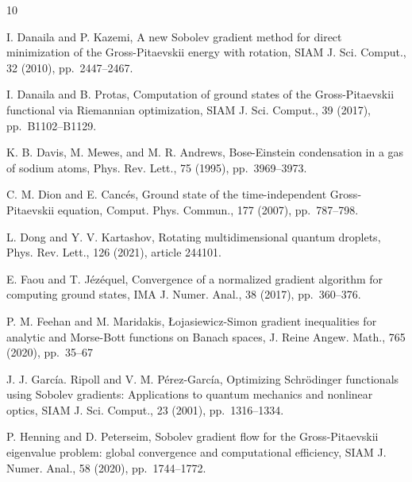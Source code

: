 \documentclass[preprint,3p]{elsarticle}
\begin{document}
\begin{thebibliography}{10}
	
	{ I. Danaila and P. Kazemi}, { A new {S}obolev gradient method for
		direct minimization of the {G}ross-{P}itaevskii energy with rotation}, SIAM
	J. Sci. Comput., 32 (2010), pp.~2447--2467.
	
	{ I. Danaila and B. Protas}, { Computation of ground states of the
		{G}ross-{P}itaevskii functional via {R}iemannian optimization}, SIAM J. Sci. Comput., 39 (2017), pp.~B1102--B1129.
	
	{ K. B. Davis, M. Mewes, and M. R. Andrews}, { Bose-{E}instein condensation
		in a gas of sodium atoms}, Phys. Rev. Lett., 75 (1995), pp.~3969--3973.
	
	{ C. M. Dion and E. Canc\'es}, { Ground state of the time-independent Gross-Pitaevskii equation}, Comput. Phys. Commun., 177 (2007), pp.~787--798.
	
	{ L. Dong and Y. V. Kartashov}, { Rotating multidimensional quantum droplets}, Phys. Rev. Lett., 126 (2021), article 244101. 
	
	{ E. Faou and T. J\'ez\'equel}, { Convergence of a normalized gradient algorithm for computing ground states}, IMA J. Numer. Anal., 38 (2017), pp.~360--376.
	
	
	{ P. M. Feehan and M. Maridakis},  { \L ojasiewicz-Simon gradient inequalities for analytic and Morse-Bott functions on Banach spaces}, J. Reine Angew. Math., 765 (2020), pp.~35--67 
	
	{ J. J. Garc\'ia. Ripoll and V. M. P\'erez-Garc\'ia}, { Optimizing Schr\"odinger functionals using Sobolev gradients: Applications to quantum mechanics and nonlinear optics}, SIAM J. Sci. Comput., 23 (2001), pp.~1316--1334.
	
	{ P. Henning and D. Peterseim}, { Sobolev gradient flow for the
		{G}ross-{P}itaevskii eigenvalue problem: global convergence and computational
		efficiency}, SIAM J. Numer. Anal., 58 (2020), pp.~1744--1772.
	

\end{thebibliography}
\end{document}
